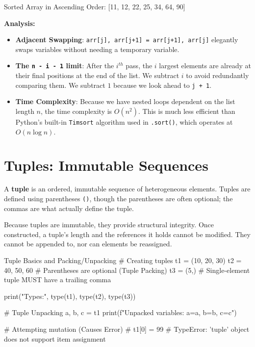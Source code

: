 \begin{outputbox}
Sorted Array in Ascending Order:
[11, 12, 22, 25, 34, 64, 90]
\end{outputbox}

\textbf{Analysis:}
\begin{itemize}
    \item \textbf{Adjacent Swapping}: \texttt{arr[j], arr[j+1] = arr[j+1], arr[j]} elegantly swaps variables without needing a temporary variable.
    \item \textbf{The \texttt{n - i - 1} limit}: After the $i^{th}$ pass, the $i$ largest elements are already at their final positions at the end of the list. We subtract $i$ to avoid redundantly comparing them. We subtract $1$ because we look ahead to \texttt{j + 1}.
    \item \textbf{Time Complexity}: Because we have nested loops dependent on the list length $n$, the time complexity is $O(n^2)$. This is much less efficient than Python's built-in \texttt{Timsort} algorithm used in \texttt{.sort()}, which operates at $O(n \log n)$.
\end{itemize}

\section{Tuples: Immutable Sequences}

A \textbf{tuple} is an ordered, immutable sequence of heterogeneous elements. Tuples are defined using parentheses \texttt{()}, though the parentheses are often optional; the commas are what actually define the tuple.

Because tuples are immutable, they provide structural integrity. Once constructed, a tuple's length and the references it holds cannot be modified. They cannot be appended to, nor can elements be reassigned.

\begin{pythoncode}[]{Tuple Basics and Packing/Unpacking}
# Creating tuples
t1 = (10, 20, 30)
t2 = 40, 50, 60     # Parentheses are optional (Tuple Packing)
t3 = (5,)           # Single-element tuple MUST have a trailing comma

print("Types:", type(t1), type(t2), type(t3))

# Tuple Unpacking
a, b, c = t1
print(f"Unpacked variables: a={a}, b={b}, c={c}")

# Attempting mutation (Causes Error)
# t1[0] = 99  # TypeError: 'tuple' object does not support item assignment
\end{pythoncode}

